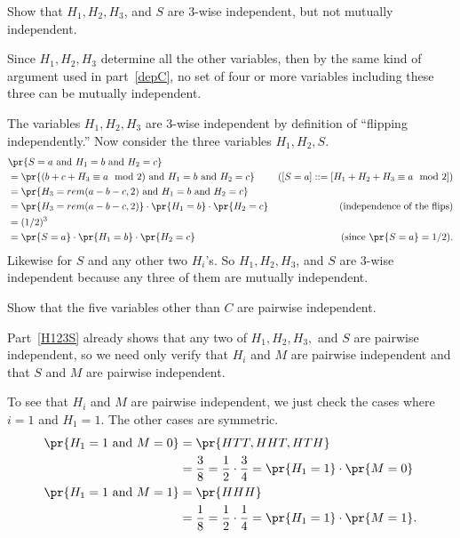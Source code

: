 \begin{problem}
\ppart\label{H123S} Show that $H_1,H_2,H_3$, and $S$ are 3-wise
independent, but not mutually independent.

\begin{solution}
Since $H_1,H_2,H_3$ determine all the other variables, then by
the same kind of argument used in part~\eqref{depC}, no set of four or
more variables including these three can be mutually independent.

The variables $H_1,H_2,H_3$ are 3-wise independent by definition of
``flipping independently.''  Now consider the three variables $H_1,H_2,S$.
\begin{align*}
\lefteqn{\pr{S=a \text{ and } H_1=b \text{ and } H_2=c}}\\
  & = \pr{(b+c+H_3 \equiv a \mod 2) \text{ and } H_1=b \text{ and } H_2=c}
      & ([S=a] ::= [H_1+H_2+H_3 \equiv a \mod 2])\\
  & = \pr{H_3 = rem(a-b-c,2) \text{ and } H_1=b \text{ and }
  H_2=c}\\
  & = \pr{H_3 = rem(a-b-c,2)}\cdot \pr{H_1=b} \cdot \pr{H_2=c} &
  \text{(independence of the flips)} \\
& = (1/2)^3 \\
& = \pr{S=a} \cdot \pr{H_1=b} \cdot \pr{H_2=c} &
  \text{(since $\pr{S=a}=1/2$)}.
\end{align*}
Likewise for $S$ and any other two $H_i$'s.  So $H_1,H_2,H_3$, and $S$ are
3-wise independent because any three of them are mutually independent.
\end{solution}

\iffalse
\ppart Show that the five variables other than $C$ are pairwise independent.

\begin{solution}

Part~\eqref{H123S} already shows that any two of $H_1,H_2,H_3,$ and $S$
are pairwise independent, so we need only verify that $H_i$ and $M$ are
pairwise independent and that $S$ and $M$ are pairwise independent.

To see that $H_i$ and $M$ are pairwise independent, we just check the cases where $i = 1$ and $H_1 =1$. The other cases are symmetric.
\begin{align*}
\pr{H_1=1 \text{ and } M=0} & = \pr{HTT, HHT, HTH}\\
    & = \frac{3}{8} = \frac{1}{2} \cdot \frac{3}{4} =\pr{H_1 = 1} \cdot \pr{M = 0}\\
\pr{H_1=1 \text{ and } M=1} & = \pr{HHH}\\
    & = \frac{1}{8} = \frac{1}{2} \cdot \frac{1}{4} =\pr{H_1 = 1} \cdot \pr{M = 1}.
\end{align*}


\end{solution}
\end{problem}
